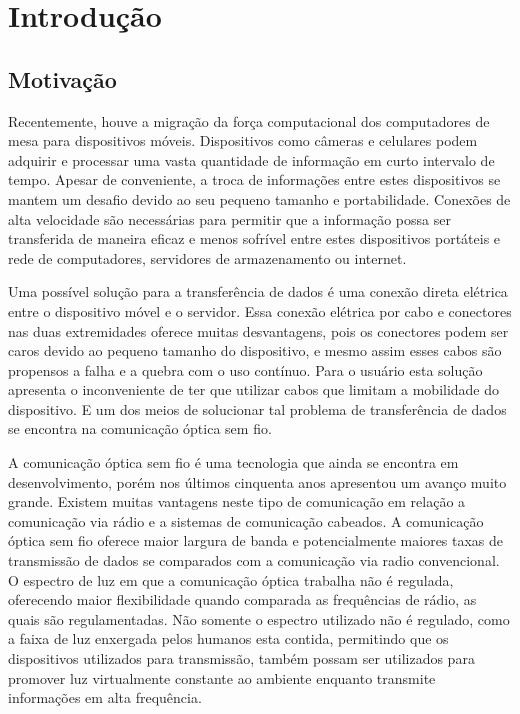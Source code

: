 \chapter*[INTRODUÇÃO]{Introdução}

\section*{Motivação}

Recentemente, houve a migração da força computacional dos computadores de mesa para dispositivos móveis. Dispositivos como câmeras e celulares podem adquirir e processar uma vasta quantidade de informação em curto intervalo de tempo. Apesar de conveniente, a troca de informações entre estes dispositivos se mantem um desafio devido ao seu pequeno tamanho e portabilidade. Conexões de alta velocidade são necessárias para permitir que a informação possa ser transferida de maneira eficaz e menos sofrível entre estes dispositivos portáteis e rede de computadores, servidores de armazenamento ou internet. 

Uma possível solução para a transferência de dados é uma conexão direta elétrica entre o dispositivo móvel e o servidor. Essa conexão elétrica por cabo e conectores nas duas extremidades oferece muitas desvantagens, pois os conectores podem ser caros devido ao pequeno tamanho do dispositivo, e mesmo assim esses cabos são propensos a falha e a quebra com o uso contínuo. 
Para o usuário esta solução apresenta o inconveniente de ter que utilizar cabos que limitam a mobilidade do dispositivo. E um dos meios de solucionar tal problema de transferência de dados se encontra na comunicação óptica sem fio.

A comunicação óptica sem fio é uma tecnologia que ainda se encontra em desenvolvimento, porém nos últimos cinquenta anos apresentou um avanço muito grande. Existem muitas vantagens neste tipo de comunicação em relação a comunicação via rádio e a sistemas de comunicação cabeados. A comunicação óptica sem fio oferece maior largura de banda e potencialmente maiores taxas de transmissão de dados se comparados com a comunicação via radio convencional.
O espectro de luz em que a comunicação óptica trabalha não é regulada, oferecendo maior flexibilidade quando comparada as frequências de rádio, as quais são regulamentadas. Não somente o espectro utilizado não é regulado, como a faixa de luz enxergada pelos humanos esta contida, permitindo que os dispositivos utilizados para transmissão, também possam ser utilizados para promover luz virtualmente constante ao ambiente enquanto transmite informações em alta frequência.\cite{Hranilovic}

